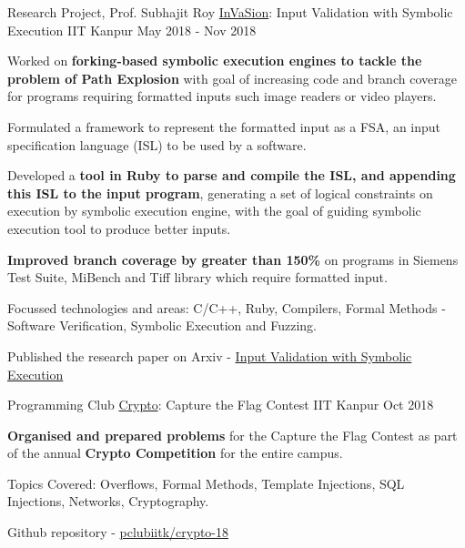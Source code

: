 \begin{cventries}
  \cventry
    {Research Project, Prof. Subhajit Roy} %
    {\href{https://arxiv.org/abs/2104.01438}{InVaSion}: Input Validation with Symbolic Execution} %
    {IIT Kanpur} %
    {May 2018 - Nov 2018} %
    {
      \begin{cvitems} %
      \item {Worked on \textbf{forking-based symbolic execution engines to tackle the problem of Path Explosion} with goal of increasing code and branch coverage for programs requiring formatted inputs such image readers or video players.}
      \item {Formulated a framework to represent the formatted input as a FSA, an input specification language (ISL) to be used by a software.}
        \item {Developed a \textbf{tool in Ruby to parse and compile the ISL, and appending this ISL to the input program}, generating a set of logical constraints on execution by symbolic execution engine, with the goal of guiding symbolic execution tool to produce better inputs.}
        \item {\textbf{Improved branch coverage by greater than 150\%} on programs in Siemens Test Suite, MiBench and Tiff library which require formatted input.}
        \item {Focussed technologies and areas: C/C++, Ruby, Compilers, Formal Methods - Software Verification, Symbolic Execution and Fuzzing.}
        \item {Published the research paper on Arxiv - \href{https://arxiv.org/abs/2104.01438}{Input Validation with Symbolic Execution}}
      \end{cvitems}
    }%



  \cventry
    {Programming Club} %
    {\href{https://github.com/pclubiitk/crypto-18}{Crypto}: Capture the Flag Contest} %
    {IIT Kanpur} %
    {Oct 2018} %
    {
      \begin{cvitems} %
      \item {\textbf{Organised and prepared problems} for the Capture the Flag Contest as part of the annual \textbf{Crypto Competition} for the entire campus.}
      \item {Topics Covered: Overflows, Formal Methods, Template Injections, SQL Injections, Networks, Cryptography.}
      \item {Github repository - \href{https://github.com/pclubiitk/crypto-18}{pclubiitk/crypto-18}}
      \end{cvitems}
    }


\end{cventries}
